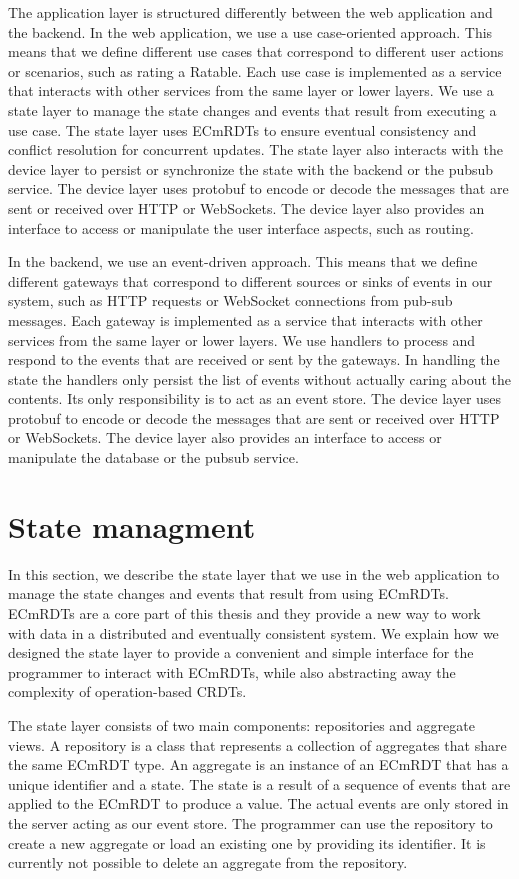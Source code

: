 \documentclass[
	ngerman,
	ruledheaders=section,   %
	class=report,		    %
	thesis={type=bachelor}, %
	accentcolor=9c,			%
	custommargins=true,    %
	marginpar=false,        %
	parskip=half-,          %
	fontsize=11pt,          %
]{tudapub}
\begin{document}
The application layer is structured differently between the web application and the backend. In the web application, we use a use case-oriented approach. This means that we define different use cases that correspond to different user actions or scenarios, such as rating a Ratable. Each use case is implemented as a service that interacts with other services from the same layer or lower layers. We use a state layer to manage the state changes and events that result from executing a use case. The state layer uses ECmRDTs to ensure eventual consistency and conflict resolution for concurrent updates. The state layer also interacts with the device layer to persist or synchronize the state with the backend or the pubsub service. The device layer uses protobuf to encode or decode the messages that are sent or received over HTTP or WebSockets. The device layer also provides an interface to access or manipulate the user interface aspects, such as routing.

In the backend, we use an event-driven approach. This means that we define different gateways that correspond to different sources or sinks of events in our system, such as HTTP requests or WebSocket connections from pub-sub messages. Each gateway is implemented as a service that interacts with other services from the same layer or lower layers. We use handlers to process and respond to the events that are received or sent by the gateways. In handling the state the handlers only persist the list of events without actually caring about the contents. Its only responsibility is to act as an event store. The device layer uses protobuf to encode or decode the messages that are sent or received over HTTP or WebSockets. The device layer also provides an interface to access or manipulate the database or the pubsub service.

\section{State managment}
In this section, we describe the state layer that we use in the web application to manage the state changes and events that result from using ECmRDTs. ECmRDTs are a core part of this thesis and they provide a new way to work with data in a distributed and eventually consistent system. We explain how we designed the state layer to provide a convenient and simple interface for the programmer to interact with ECmRDTs, while also abstracting away the complexity of operation-based CRDTs.

The state layer consists of two main components: repositories and aggregate views. A repository is a class that represents a collection of aggregates that share the same ECmRDT type. An aggregate is an instance of an ECmRDT that has a unique identifier and a state. The state is a result of a sequence of events that are applied to the ECmRDT to produce a value. The actual events are only stored in the server acting as our event store. The programmer can use the repository to create a new aggregate or load an existing one by providing its identifier. It is currently not possible to delete an aggregate from the repository.
\end{document}
